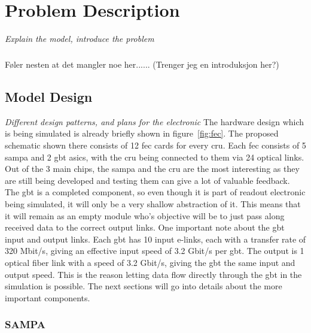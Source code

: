 \documentclass[a4paper]{report}
\begin{document}
\chapter{Problem Description}
\textit{Explain the model, introduce the problem}

\paragraph{}
Føler nesten at det mangler noe her...... (Trenger jeg en introduksjon her?)

\section{Model Design}
\textit{Different design patterns, and plans for the electronic}
The hardware design which is being simulated is already briefly shown in figure~\ref{fig:fec}.
The proposed schematic shown there consists of 12 \gls{fec} cards for every \gls{cru}.
Each \gls{fec} consists of 5 \gls{sampa} and 2 \gls{gbt} \glspl{asic}, with the \gls{cru} being connected to them via 24 optical links.
Out of the 3 main chips, the \gls{sampa} and the \gls{cru} are the most interesting as they are still being developed and testing them can give a lot of valuable feedback.
The \gls{gbt} is a completed component, so even though it is part of readout electronic being simulated, it will only be a very shallow abstraction of it.
This means that it will remain as an empty module who's objective will be to just pass along received data to the correct output links.
One important note about the \gls{gbt} input and output links.
Each \gls{gbt} has 10 input e-links, each with a transfer rate of 320 Mbit/s, giving an effective input speed of 3.2 Gbit/s per \gls{gbt}.
The output is 1 optical fiber link with a speed of 3.2 Gbit/s, giving the \gls{gbt} the same input and output speed.
This is the reason letting data flow directly through the \gls{gbt} in the simulation is possible.
The next sections will go into details about the more important components.

\subsection{SAMPA}
\label{subsec:sampa}
\end{document}
